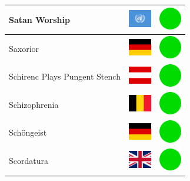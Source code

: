 \documentclass[12pt, a4paper, twoside]{report}
\begin{document}
\begin{center}
\begin{longtable}{|p{5cm}|p{2cm}|p{2cm}|}
 Satan Worship                                              & \includegraphics[width=1cm]{4x3/un} &   \includegraphics[width=1cm]{likes/y} \\ \hline
 Saxorior                                                   & \includegraphics[width=1cm]{4x3/de} &   \includegraphics[width=1cm]{likes/y} \\ \hline
 Schirenc Plays Pungent Stench                              & \includegraphics[width=1cm]{4x3/at} &   \includegraphics[width=1cm]{likes/y} \\ \hline
 Schizophrenia                                              & \includegraphics[width=1cm]{4x3/be} &   \includegraphics[width=1cm]{likes/y} \\ \hline
 Schöngeist                                                 & \includegraphics[width=1cm]{4x3/de} &   \includegraphics[width=1cm]{likes/y} \\ \hline
 Scordatura                                                 & \includegraphics[width=1cm]{4x3/gb} &   \includegraphics[width=1cm]{likes/y} \\ \hline

\end{longtable}
\end{center}
\end{document}
